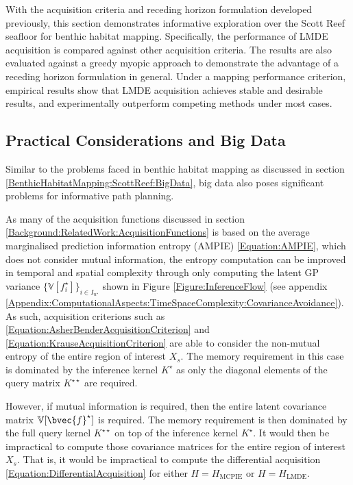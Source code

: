 		With the acquisition criteria and receding horizon formulation developed previously, this section demonstrates informative exploration over the Scott Reef seafloor for benthic habitat mapping. Specifically, the performance of LMDE acquisition is compared against other acquisition criteria. The results are also evaluated against a greedy myopic approach to demonstrate the advantage of a receding horizon formulation in general. Under a mapping performance criterion, empirical results show that LMDE acquisition achieves stable and desirable results, and experimentally outperform competing methods under most cases.
		
		\subsection{Practical Considerations and Big Data}
		\label{InformativeSeafloorExploration:ScottReef:BigData}
		
			Similar to the problems faced in benthic habitat mapping as discussed in section \ref{BenthicHabitatMapping:ScottReef:BigData}, big data also poses significant problems for informative path planning.
			
			As many of the acquisition functions discussed in section \ref{Background:RelatedWork:AcquisitionFunctions} is based on the average marginalised prediction information entropy (AMPIE) \eqref{Equation:AMPIE}, which does not consider mutual information, the entropy computation can be improved in temporal and spatial complexity through only computing the latent GP variance $\{\mathbb{V}[f^{\star}_{i}]\}_{i \in I_{n^{\star}}}$ shown in Figure \ref{Figure:InferenceFlow} (see appendix \ref{Appendix:ComputationalAspects:TimeSpaceComplexity:CovarianceAvoidance}). As such, acquisition criterions such as \eqref{Equation:AsherBenderAcquisitionCriterion} and \eqref{Equation:KrauseAcquisitionCriterion} are able to consider the non-mutual entropy of the entire region of interest $X_{s}$. The memory requirement in this case is dominated by the inference kernel $K^{\star}$ as only the diagonal elements of the query matrix $K^{\star \star}$ are required. 
			
			However, if mutual information is required, then the entire latent covariance matrix $\mathbb{V}[\bvec{f}^{\star}]$ is required. The memory requirement is then dominated by the full query kernel $K^{\star \star}$ on top of the inference kernel $K^{\star}$. It would then be impractical to compute those covariance matrices for the entire region of interest $X_{s}$. That is, it would be impractical to compute the differential acquisition \eqref{Equation:DifferentialAcquisition} for either $H = H_{\mathrm{MCPIE}}$ or $H = H_{\mathrm{LMDE}}$.
			
